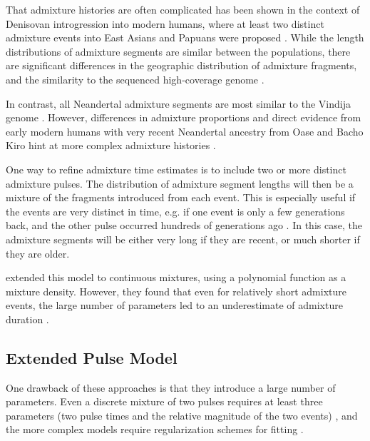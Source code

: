 \documentclass[]{article}
\begin{document}
That admixture histories are often complicated has been shown in the context of Denisovan introgression into modern humans, where at least two distinct admixture events into East Asians and Papuans were proposed \citep{browning_analysis_2018, jacobs_multiple_2019}. While the length distributions of admixture segments are similar between the populations, there are significant differences in the geographic distribution of admixture fragments, and the similarity to the sequenced high-coverage genome \citep{browning_analysis_2018, massilani_denisovan_2020}. 

In contrast, all Neandertal admixture segments are most similar to the Vindija genome \citep{prufer_high-coverage_2017}. However, differences in admixture proportions \citep{meyer_high-coverage_2012, wall_higher_2013,kim_selection_2015,vernot_complex_2015,villanea_multiple_2019} and direct evidence from early modern humans with very recent Neandertal ancestry from Oase and Bacho Kiro hint at more complex admixture histories \citep{fu_early_2015,hajdinjak_early_2021}.


One way to refine admixture time estimates is to include two or more distinct admixture pulses. The distribution of admixture segment lengths will then be a mixture of the fragments introduced from each event. This is especially useful if the events are very distinct in time, e.g. if one event is only a few generations back, and the other pulse occurred hundreds of generations ago \citep{fu_genome_2014, fu_early_2015, hajdinjak_early_2021}. In this case, the admixture segments will be either very long if they are recent, or much shorter if they are older.

\cite{zhou_modeling_2017} extended this model to continuous mixtures, using a polynomial function as a mixture density. However, they found that even for relatively short admixture events, the large number of parameters led to an underestimate of admixture duration \citep{zhou_inference_2017}. 
\subsection{Extended Pulse Model}
One drawback of  these approaches is that they introduce a large number of parameters. Even a discrete mixture of two pulses requires at least three parameters (two pulse times and the relative magnitude of the two events) \citep{pickrell_ancient_2014}, and the more complex models require regularization schemes for fitting \citep{zhou_inference_2017, ralph_geography_2013}.
\end{document}
